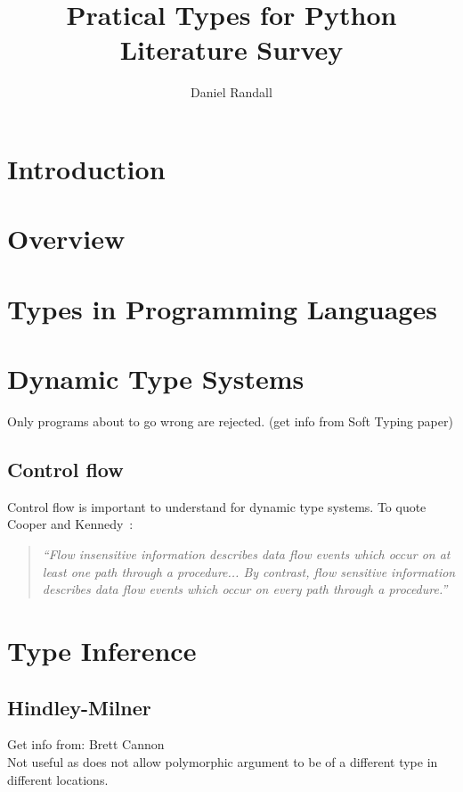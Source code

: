 \documentclass[12pt, titlepage]{article}
\title{Pratical Types for Python \\ Literature Survey}
\author{Daniel Randall}
\date{}
\begin{document}
\maketitle

\tableofcontents
\newpage

\section{Introduction}



\section{Overview}



\section{Types in Programming Languages}

\section{Dynamic Type Systems}
Only programs about to go wrong are rejected. (get info from Soft Typing paper)

\subsection{Control flow}
Control flow is important to understand for dynamic type systems. To quote Cooper and Kennedy~\cite{controlFlowCooperKennedy}:
\begin{quote}
	\emph{``Flow insensitive information describes data flow events which occur on at least one path through a procedure... By contrast, flow sensitive information describes data flow events which occur on every path through a procedure.''}
\end{quote}

\section{Type Inference}

\subsection{Hindley-Milner}

Get info from:
Brett Cannon	 \\
Not useful as does not allow polymorphic argument to be of a different type in different locations.
\end{document}
